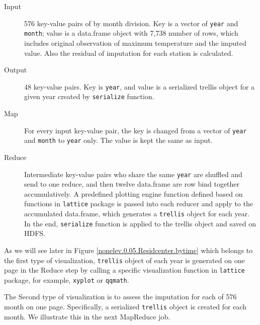 \begin{description}
  \item[Input] 576 key-value pairs of by month division. Key is a vector of
  \texttt{year} and \texttt{month}; value is a data.frame object with 7,738 
  number of rows, which includes original observation of maximum temperature
  and the imputed value. Also the residual of imputation for each station is 
  calculated.
  \item[Output] 48 key-value pairs. Key is \texttt{year}, and value is a serialized
  trellis object for a given year created by \texttt{serialize} function.
  \item[Map]For every input key-value pair, the key is changed from a vector of 
  \texttt{year} and \texttt{month} to \texttt{year} only. The value is kept the
  same as input.
  \item[Reduce] Intermediate key-value pairs who share the same \texttt{year} are
  shuffled and send to one reduce, and then twelve data.frame are row bind 
  together accumulatively. A predefined plotting engine function defined based on 
  functions in \texttt{lattice} package is passed into each reducer and apply to 
  the accumulated data.frame, which generates a \texttt{trellis} object for each 
  year. In the end, \texttt{serialize} function is applied to the trellis object 
  and saved on HDFS.
\end{description}

As we will see later in Figure 
\href{../plots/a1950/spaimpute/nonelev/span0.05/a1950.spaResidcenter.bytime.pdf}
{\ref*{nonelev.0.05.Residcenter.bytime}} which belongs to the first type of 
visualization, \texttt{trellis} object of each year is generated on one page in 
the Reduce step by calling a specific visualization function in \texttt{lattice} 
package, for example, \texttt{xyplot} or \texttt{qqmath}.

The Second type of visualization is to assess the imputation for each of 576 month
on one page. Specifically, a serialized \texttt{trellis} object is created for 
each month. We illustrate this in the next MapReduce job.

